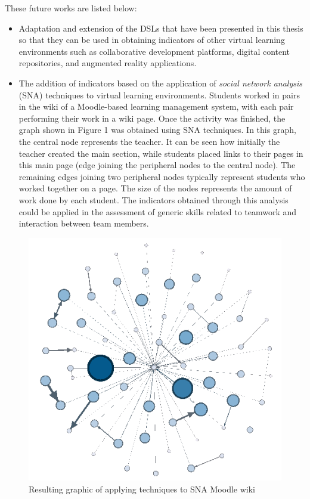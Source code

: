 These future works are listed below:
\begin{itemize}
\item Adaptation and extension of the DSLs that have been presented in this thesis so that they can be used in obtaining indicators of other virtual learning environments such as collaborative development platforms, digital content repositories, and augmented reality applications.
\item The addition of indicators based on the application of \emph{social network analysis} (SNA) techniques to virtual learning environments. Students worked in pairs in the wiki of a Moodle-based learning management system, with each pair performing their work in a wiki page. Once the activity was finished, the graph shown in Figure 1 was obtained using SNA techniques. In this graph, the central node represents the teacher. It can be seen how initially the teacher created the main section, while students placed links to their pages in this main page (edge ​​joining the peripheral nodes to the central node). The remaining edges joining two peripheral nodes typically represent students who worked together on a page. The size of the nodes represents the amount of work done by each student. The indicators obtained through this analysis could be applied in the assessment of generic skills related to teamwork and interaction between team members.
\end{itemize}

\begin{figure}[h]
  \begin{center}
    \includegraphics[scale=0.5]{SNA-Grafo-Wiki-SD.png}
  \end{center}
  \caption{Resulting graphic of applying techniques to SNA Moodle wiki}
  \label{fig:SNAWikiEN}
\end{figure}


